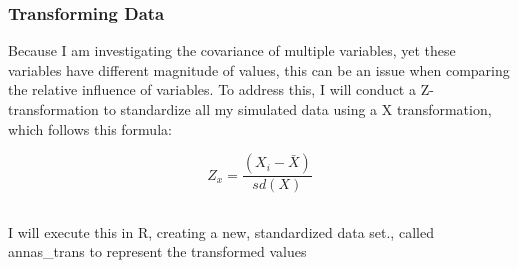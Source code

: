 \documentclass[
  letterpaper,
  DIV=11,
  numbers=noendperiod]{scrartcl}
\begin{document}
\hypertarget{transforming-data}{%
\subsubsection{Transforming Data}\label{transforming-data}}

Because I am investigating the covariance of multiple variables, yet
these variables have different magnitude of values, this can be an issue
when comparing the relative influence of variables. To address this, I
will conduct a Z- transformation to standardize all my simulated data
using a X transformation, which follows this formula:

\[
Z_x = \frac{(X_i - \bar X)}{sd(X)}
\]

\hypertarget{section}{%
\subsection{}\label{section}}

I will execute this in R, creating a new, standardized data set., called
annas\_trans to represent the transformed values
\end{document}
